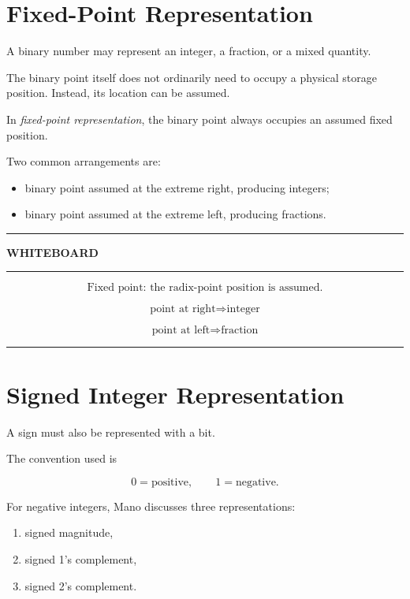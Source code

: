 \documentclass[11pt]{article}
\newenvironment{whiteboard}
{
    \par\medskip
    \begin{center}
    \begin{minipage}{0.94\textwidth}
    \hrule
    \vspace{0.4em}
    \textbf{\large WHITEBOARD}
    \vspace{0.3em}
    \hrule
    \vspace{0.7em}
}
{
    \vspace{0.5em}
    \hrule
    \end{minipage}
    \end{center}
    \medskip
}
\begin{document}
\section{Fixed-Point Representation}

A binary number may represent an integer, a fraction, or a mixed quantity.

The binary point itself does not ordinarily need to occupy a physical storage
position. Instead, its location can be assumed.

In \emph{fixed-point representation}, the binary point always occupies an
assumed fixed position.

Two common arrangements are:

\begin{itemize}
    \item binary point assumed at the extreme right, producing integers;
    \item binary point assumed at the extreme left, producing fractions.
\end{itemize}

\begin{whiteboard}
\[
\boxed{\text{Fixed point: the radix-point position is assumed.}}
\]

\[
\text{point at right}\Rightarrow\text{integer}
\]

\[
\text{point at left}\Rightarrow\text{fraction}
\]
\end{whiteboard}

\section{Signed Integer Representation}

A sign must also be represented with a bit.

The convention used is

\[
0=\text{positive},
\qquad
1=\text{negative}.
\]

For negative integers, Mano discusses three representations:

\begin{enumerate}
    \item signed magnitude,
    \item signed 1's complement,
    \item signed 2's complement.
\end{enumerate}
\end{document}
